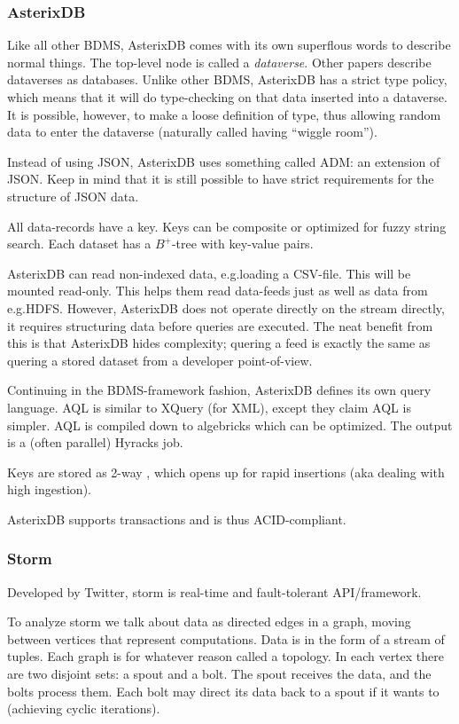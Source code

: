 \subsubsection{AsterixDB}\label{sec:asterixdb}
Like all other BDMS, AsterixDB comes with its own superflous words to describe
normal things. The top-level node is called a \textit{dataverse}. Other papers describe
dataverses as databases. Unlike other BDMS, AsterixDB has a strict type policy,
which means that it will do type-checking on that data inserted into a dataverse.
It is possible, however, to make a loose definition of type, thus allowing random data
to enter the dataverse (naturally called having ``wiggle room'').

Instead of using JSON, AsterixDB uses something called ADM: an
extension of JSON. Keep in mind that it is still possible to have strict
requirements for the structure of JSON data. 

All data-records have a key. Keys can be composite or optimized for fuzzy string search.
Each dataset has a $B^{+}$-tree with key-value pairs.

AsterixDB can read non-indexed data, e.g.\@ loading a CSV-file. This will be mounted read-only.
This helps them read data-feeds just as well as data from e.g.\@ HDFS. However, AsterixDB does not operate
directly on the stream directly, it requires structuring data before queries are executed.
The neat benefit from this is that AsterixDB hides complexity; quering a feed is exactly
the same as quering a stored dataset from a developer point-of-view.

Continuing in the BDMS-framework fashion, AsterixDB defines its own query language.
AQL is similar to XQuery (for XML), except they claim AQL is simpler. AQL is compiled down to algebricks
which can be optimized. The output is a (often parallel) Hyracks job.

Keys are stored as 2-way , which opens up for rapid insertions 
(aka dealing with high ingestion).

AsterixDB supports transactions and is thus ACID-compliant.


\subsubsection{Storm}\label{sec:storm}
Developed by Twitter, storm is real-time and fault-tolerant API/framework.

To analyze storm we talk about data as directed edges in a graph, moving between vertices
that represent computations. Data is in the form of a stream of tuples.
Each graph is for whatever reason called a topology. In each vertex there are
two disjoint sets: a spout and a bolt. The spout receives the data, and the bolts
process them. Each bolt may direct its data back to a spout if it wants to (achieving cyclic iterations).

